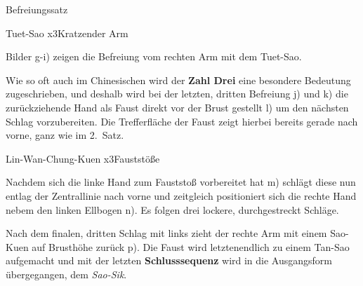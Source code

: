 \begin{WTSatz}{Befreiungssatz}
\begin{WTSatzTeil}{Tuet-Sao x3}{Kratzender Arm}
		
		Bilder g-i) zeigen die Befreiung vom rechten Arm mit dem Tuet-Sao.
		

		Wie so oft auch im Chinesischen wird der \textbf{Zahl Drei} eine besondere Bedeutung zugeschrieben, und deshalb wird bei der letzten, dritten Befreiung j) und k) die zur\"uckziehende Hand als Faust direkt vor der Brust gestellt l) um den n\"achsten Schlag vorzubereiten. Die Trefferfl\"ache der Faust zeigt hierbei bereits gerade nach vorne, ganz wie im 2.~Satz.
		
	\end{WTSatzTeil}
	\begin{WTSatzTeil}{Lin-Wan-Chung-Kuen x3}{Faustst\"o{\ss}e}
	
		
		
		Nachdem sich die linke Hand zum Fauststo{\ss} vorbereitet hat m) schl\"agt diese nun entlag der Zentrallinie nach vorne und zeitgleich positioniert sich die rechte Hand nebem den linken Ellbogen n). Es folgen drei lockere, durchgestreckt Schl\"age.
		
		
		Nach dem finalen, dritten Schlag mit links zieht der rechte Arm mit einem Sao-Kuen auf Brusth\"ohe zur\"uck p). Die Faust wird letztenendlich zu einem Tan-Sao aufgemacht und mit der letzten \textbf{Schlusssequenz} wird in die Ausgangsform \"ubergegangen, dem \textit{Sao-Sik}.

		
	\end{WTSatzTeil}
\end{WTSatz}
